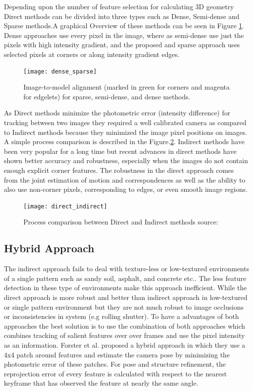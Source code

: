 Depending upon the number of feature selection for calculating 3D geometry Direct methods can be divided into three types such as Dense, Semi-dense and Sparse methods.A graphical Overview of these methods can be seen in Figure \ref{fig:dense_sparse}. Dense approaches use every pixel in the image, where as semi-dense use just the pixels with high intensity gradient, and the proposed and sparse approach uses selected pixels at corners or along intensity gradient edges.\cite{engel14eccv}

 \begin{figure}[h]
	\centering
	\texttt{[image: dense\_sparse]}
	\caption{Image-to-model alignment (marked in green for corners and magenta for
		edgelets) for sparse, semi-dense, and dense methods. \cite{7782863} }
	\label{fig:dense_sparse}
\end{figure}

As Direct methods minimize the photometric error (intensity difference) for tracking between two images they required a well calibrated camera as compared to Indirect methods because they minimized the image pixel positions on images. A simple process comparison is described in the Figure.\ref{fig:directIndirect}. Indirect methods have been very popular for a long time but recent advances in direct methods have shown better accuracy and robustness, especially when the images do not contain enough explicit corner features.\cite{Engel-et-al-pami2018} The robustness in the direct approach comes from the joint estimation of motion and correspondences as well as the ability to also use non-corner pixels, corresponding to edges, or even smooth image regions.\cite{gao2018ldso}

\begin{figure}[h]
	\centering
	\texttt{[image: direct\_indirect]}
	\caption{Process comparison between Direct and Indirect methods {source:\cite{engel14eccv}}}
	\label{fig:directIndirect}
\end{figure}


\subsection{Hybrid Approach}
The indirect approach fails to deal with texture-less or low-textured environments of a single pattern such as sandy soil, asphalt, and concrete etc.. The less feature detection in these type of environments make this approach inefficient. While the direct approach is more robust and better than indirect approach in low-textured or single pattern environment but they are not much robust to image occlusions or inconsistencies in system (e.g rolling shutter). To have a advantages of both approaches the best solution is to use the combination of both approaches which combines tracking of salient features over over frames and use the pixel intensity as an information\cite{Aqel-et-al-2016}. Forster et al.\cite{7782863} proposed a hybrid approach in which they use a 4x4 patch around features and estimate the camera pose by minimizing the photometric error of these patches. For pose and structure refinement, the reprojection error of every feature is calculated with respect to the nearest keyframe that has observed the feature at nearly the same angle. \\

